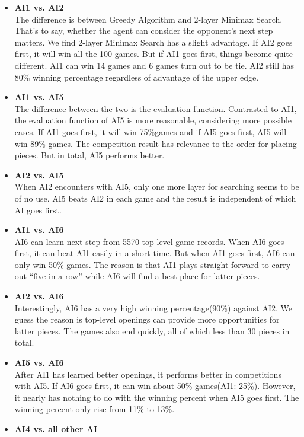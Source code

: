 \documentclass[12pt,a4paper]{article}
\begin{document}
\begin{itemize}
\item \textbf{AI1 vs. AI2}\\
The difference is between Greedy Algorithm and 2-layer Minimax Search. That's to say, whether the agent can consider the opponent's next step matters. We find 2-layer Minimax Search has a slight advantage. If AI2 goes first, it will win all the 100 games. But if AI1 goes first, things become quite different. AI1 can win 14 games and 6 games turn out to be tie. AI2 still has 80\% winning percentage regardless of advantage of the upper edge.
\item \textbf{AI1 vs. AI5}\\
The difference between the two is the evaluation function. Contrasted to AI1, the evaluation function of AI5 is more reasonable, considering more possible cases. If AI1 goes first, it will win 75\%games and if AI5 goes first, AI5 will win 89\% games. The competition result has relevance to the order for placing pieces. But in total, AI5 performs better.
\item \textbf{AI2 vs. AI5}\\
When AI2 encounters with AI5, only one more layer for searching seems to be of no use. AI5 beats AI2 in each game and the result is independent of which AI goes first.
\item \textbf{AI1 vs. AI6}\\
AI6 can learn next step from 5570 top-level game records. When AI6 goes first, it can beat AI1 easily in a short time. But when AI1 goes first, AI6 can only win 50\% games. The reason is that AI1 plays straight forward to carry out ``five in a row'' while AI6 will find a best place for latter pieces.
\item \textbf{AI2 vs. AI6}\\
Interestingly, AI6 has a very high winning percentage(90\%) against AI2. We guess the reason is top-level openings can provide more opportunities for latter pieces. The games also end quickly, all of which less than 30 pieces in total.
\item \textbf{AI5 vs. AI6}\\
After AI1 has learned better openings, it performs better in competitions with AI5. If AI6 goes first, it can win about 50\% games(AI1: 25\%). However, it nearly has nothing to do with the winning percent when AI5 goes first. The winning percent only rise from 11\% to 13\%.
\item \textbf{AI4 vs. all other AI}\\

\end{itemize}
\end{document}
